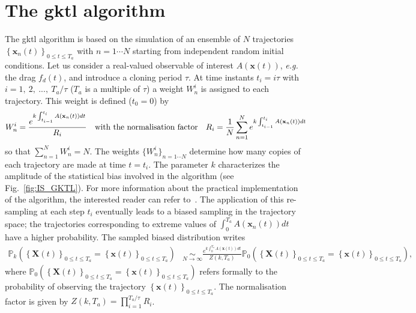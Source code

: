 \section{The \ac{gktl} algorithm}
\label{app:gktl}
The \ac{gktl} algorithm is based on the simulation of an ensemble of $N$ trajectories $\left\{\mathbf{x}_{n}(t)\right\}_{0\leq t \leq T_a}$ with $ n =1 \cdots N$ starting from independent random initial conditions.
%
Let us consider a real-valued observable of interest $A(\mathbf{x}(t))$, {\emph{e.g.} the drag $f_d(t)$}, and introduce a cloning period $\tau$.
%
At time instants $t_{i}=i\tau$ with $i=1,~2,~...,~T_{a}/\tau$ ($T_{a}$ is a multiple of $\tau$) a weight $W_{n}^{i}$ is assigned to each trajectory. This weight is defined ($t_0=0$) by
%
\begin{equation}
W_{n}^{i}=\frac{e^{k\intop_{t_{i-1}}^{t_{i}}A(\mathbf{x}_{n}(t))dt}}{R_{i}}\quad \mbox{with the normalisation factor} \quad R_{i}=\frac{1}{N}\sum_{n=1}^{N}e^{k\int_{t_{i-1}}^{t_{i}}A(\mathbf{x}_{n}(t))dt}
\label{eq:Weight}
\end{equation}
so that $\sum_{n=1}^N W_n^i = N$.
%
%
{The weights $\{W_{n}^{i}\}_{n=1\cdots N}$ determine how many copies of each trajectory are made at time $t=t_i$. The parameter $k$ characterizes the amplitude of the statistical bias involved in the algorithm (see Fig.~\ref{fig:IS_GKTL}). For more information about the practical implementation of the algorithm, the interested reader can refer to~\cite{brewer2018efficient, lestang:tel-01974316}}.
The application of this re-sampling at each step $t_i$ eventually leads to a biased sampling in the trajectory space; the trajectories corresponding to extreme values of $\int_{0}^{T_a}A(\mathbf{x}_{n}(t))dt$ have a higher probability.
%
The sampled biased distribution writes
%
\begin{align}
\mathbb{P}_{k}\left(\left\{ \mathbf{X}(t)\right\} _{0\leq t\leq T_{a}}=\left\{ \mathbf{x}(t)\right\} _{0\leq t\leq T_{a}}\right) &\underset{N\rightarrow\infty}{\sim} \frac{e^{k\int_{0}^{T_{a}}A(\mathbf{x}(t))dt}}{Z(k,T_a)}\mathbb{\mathbb{P}}_{0}\left(\left\{ \mathbf{X}(t)\right\} _{0\leq t\leq T_{a}}=\left\{ \mathbf{x}(t)\right\} _{0\leq t\leq T_{a}}\right),
\label{eq:Biased_Path_Approximation}
\end{align}
where
$\mathbb{P}_{0}\left(\left\{ \mathbf{X}(t)\right\} _{0\leq t\leq T_{a}} = \left\{ \mathbf{x}(t)\right\} _{0\leq t\leq T_{a}}\right)$
refers formally to the probability of observing the trajectory
$\left\{ \mathbf{x}(t)\right\} _{0\leq t\leq T_{a}}$.
The normalisation factor is given by $Z(k,T_a)=\prod_{i=1}^{T_a/\tau}R_i$.
